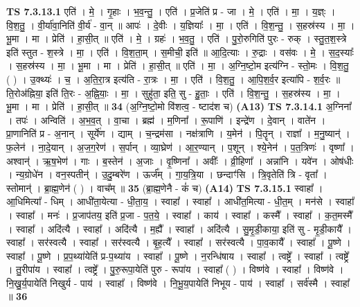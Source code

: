 \documentclass[17pt]{extarticle}
\begin{document}
                                \textbf{ TS 7.3.13.1} \newline
                  एति॑ । मे॒ । गृ॒हाः । भ॒व॒न्तु॒ । एति॑ । प्र॒जेति॑ प्र - जा । मे॒ । एति॑ । मा॒ । य॒ज्ञ्ः । वि॒श॒तु॒ । वी॒र्या॑वा॒निति॑ वी॒र्य॑ - वा॒न् ॥ आपः॑ । दे॒वीः । य॒ज्ञियाः᳚ । मा॒ । एति॑ । वि॒श॒न्तु॒ । स॒हस्र॑स्य । मा॒ । भू॒मा । मा । प्रेति॑ । हा॒सी॒त् ॥ एति॑ । मे॒ । ग्रहः॑ । भ॒व॒तु॒ । एति॑ । पु॒रो॒रुगिति॑ पुरः - रुक् । स्तु॒त॒श॒स्त्रे इति॑ स्तुत - श॒स्त्रे । मा॒ । एति॑ । वि॒श॒ता॒म् । स॒मीची॒ इति॑ ॥ आ॒दि॒त्याः । रु॒द्राः । वस॑वः । मे॒ । स॒द॒स्याः᳚ । स॒हस्र॑स्य । मा॒ । भू॒मा । मा । प्रेति॑ । हा॒सी॒त् ॥ एति॑ । मा॒ । अ॒ग्नि॒ष्टो॒म इत्य॑ग्नि - स्तो॒मः । वि॒श॒तु॒ ( ) । उ॒क्थ्यः॑ । च॒ । अ॒ति॒रा॒त्र इत्य॑ति - रा॒त्रः । मा॒ । एति॑ । वि॒श॒तु॒ । आ॒पि॒श॒र्व॒र इत्या॑पि - श॒र्व॒रः ॥ ति॒रो‌अ॑ह्निया॒ इति॑ ति॒रः - अ॒ह्नि॒याः॒ । मा॒ । सुहु॑ता॒ इति॒ सु - हु॒ताः॒ । एति॑ । वि॒श॒न्तु॒ । स॒हस्र॑स्य । मा॒ । भू॒मा । मा । प्रेति॑ । हा॒सी॒त् ॥ \textbf{  34 } \newline
                  \newline
                      (अ॒ग्नि॒ष्टो॒मो वि॑शत्व॒ - ष्टाद॑श च)  \textbf{(A13)} \newline \newline
                                \textbf{ TS 7.3.14.1} \newline
                  अ॒ग्निना᳚ । तपः॑ । अन्विति॑ । अ॒भ॒व॒त् । वा॒चा । ब्रह्म॑ । म॒णिना᳚ । रू॒पाणि॑ । इन्द्रे॑ण । दे॒वान् । वाते॑न । प्रा॒णानिति॑ प्र - अ॒नान् । सूर्ये॑ण । द्याम् । च॒न्द्रम॑सा । नक्ष॑त्राणि । य॒मेन॑ । पि॒तॄन् । राज्ञा᳚ । म॒नु॒ष्यान्॑ । फ॒लेन॑ । ना॒दे॒यान् । अ॒ज॒ग॒रेण॑ । स॒र्पान् । व्या॒घ्रेण॑ । आ॒र॒ण्यान् । प॒शून् । श्ये॒नेन॑ । प॒त॒त्रिणः॑ । वृष्णा᳚ । अश्वान्॑ । ऋ॒ष॒भेण॑ । गाः । ब॒स्तेन॑ । अ॒जाः । वृ॒ष्णिना᳚ । अवीः᳚ । व्री॒हिणा᳚ । अन्ना॑नि । यवे॑न । ओष॑धीः । न्य॒ग्रोधे॑न । वन॒स्पतीन्॑ । उ॒दु॒म्बरे॑ण । ऊर्ज᳚म् । गा॒य॒त्रि॒या । छन्दाꣳ॑सि । त्रि॒वृतेति॑ त्रि - वृता᳚ । स्तोमान्॑ । ब्रा॒ह्म॒णेन॑ ( ) । वाच᳚म् ॥ \textbf{  35} \newline
                  \newline
                      (ब्रा॒ह्म॒णेनै - कं॑ च)  \textbf{(A14)} \newline \newline
                                \textbf{ TS 7.3.15.1} \newline
                  स्वाहा᳚ । आ॒धिमित्या᳚ - धिम् । आधी॑ता॒येत्या - धी॒ता॒य॒ । स्वाहा᳚ । स्वाहा᳚ । आधी॑त॒मित्या - धी॒त॒म् । मन॑से । स्वाहा᳚ । स्वाहा᳚ । मनः॑ । प्र॒जाप॑तय॒ इति॑ प्र॒जा - प॒त॒ये॒ । स्वाहा᳚ । काय॑ । स्वाहा᳚ । कस्मै᳚ । स्वाहा᳚ । क॒त॒मस्मै᳚ । स्वाहा᳚ । अदि॑त्यै । स्वाहा᳚ । अदि॑त्यै । म॒ह्यै᳚ । स्वाहा᳚ । अदि॑त्यै । सु॒मृ॒डी॒काया॒ इति॑ सु - मृ॒डी॒कायै᳚ । स्वाहा᳚ । सर॑स्वत्यै । स्वाहा᳚ । सर॑स्वत्यै । बृ॒ह॒त्यै᳚ । स्वाहा᳚ । सर॑स्वत्यै । पा॒व॒कायै᳚ । स्वाहा᳚ । पू॒ष्णे । स्वाहा᳚ । पू॒ष्णे । प्र॒प॒थ्या॑येति॑ प्र-प॒थ्या॑य । स्वाहा᳚ । पू॒ष्णे । न॒रन्धि॑षाय । स्वाहा᳚ । त्वष्ट्रे᳚ । स्वाहा᳚ । त्वष्ट्रे᳚ । तु॒रीपा॑य । स्वाहा᳚ । त्वष्ट्रे᳚ । पु॒रु॒रूपा॒येति॑ पुरु - रूपा॑य । स्वाहा᳚ ( ) । विष्ण॑वे । स्वाहा᳚ । विष्ण॑वे । नि॒खु॒र्य॒पायेति॑ निखुर्य - पाय॑ । स्वाहा᳚ । विष्ण॑वे । नि॒भू॒य॒पायेति॑ निभूय - पाय॑ । स्वाहा᳚ । सर्व॑स्मै । स्वाहा᳚ ॥ \textbf{  36 } \newline
\end{document}

